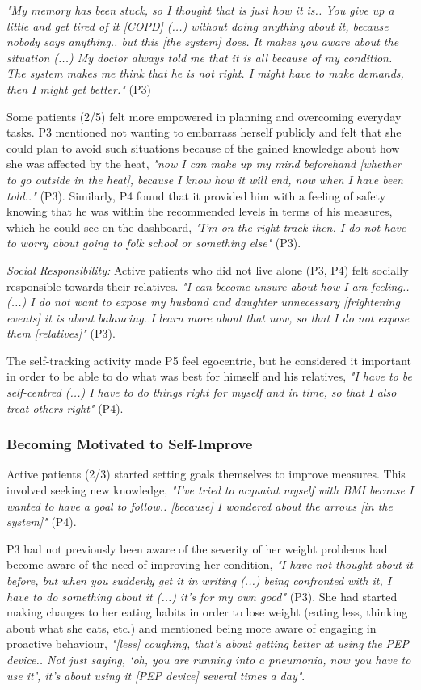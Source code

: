 \textit{"My memory has been stuck, so I thought that is just how it is.. You give up a little and get tired of it [COPD] (...) without doing anything about it, because nobody says anything.. but this [the system] does. It makes you aware about the situation (...) My doctor always told me that it is all because of my condition. The system makes me think that he is not right. I might have to make demands, then I might get better."} (P3) 

Some patients (2/5) felt more empowered in planning and overcoming everyday tasks. P3 mentioned not wanting to embarrass herself publicly and felt that she could plan to avoid such situations because of the gained knowledge about how she was affected by the heat, \textit{"now I can make up my mind beforehand [whether to go outside in the heat], because I know how it will end, now when I have been told.."} (P3). Similarly, P4 found that it provided him with a feeling of safety knowing that he was within the recommended levels in terms of his measures, which he could see on the dashboard, \textit{"I'm on the right track then. I do not have to worry about going to folk school or something else"} (P3). 

\textit{Social Responsibility:} Active patients who did not live alone (P3, P4) felt socially responsible towards their relatives. \textit{"I can become unsure about how I am feeling.. (...) I do not want to expose my husband and daughter unnecessary [frightening events] it is about balancing..I learn more about that now, so that I do not expose them [relatives]"} (P3). 

The self-tracking activity made P5 feel egocentric, but he considered it important in order to be able to do what was best for himself and his relatives, \textit{"I have to be self-centred (...) I have to do things right for myself and in time, so that I also treat others right"} (P4). 

\subsubsection{Becoming Motivated to Self-Improve}
Active patients (2/3) started setting goals themselves to improve measures. This involved seeking new knowledge, \textit{"I've tried to acquaint myself with BMI because I wanted to have a goal to follow.. [because] I wondered about the arrows [in the system]"} (P4). 

P3 had not previously been aware of the severity of her weight problems had become aware of the need of improving her condition, \textit{"I have not thought about it before, but when you suddenly get it in writing (...) being confronted with it, I have to do something about it (...) it's for my own good"} (P3). She had started making changes to her eating habits in order to lose weight (eating less, thinking about what she eats, etc.) and mentioned being more aware of engaging in proactive behaviour, \textit{"[less] coughing, that's about getting better at using the PEP device.. Not just saying, ‘oh, you are running into a pneumonia, now you have to use it', it's about using it [PEP device] several times a day"}. 

